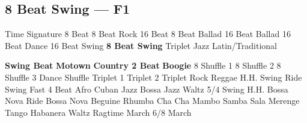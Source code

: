 \subsection{8 Beat Swing --- \UiKey{\II}\UiKey{\MET}F1}
Time Signature
8 Beat
8 Beat Rock
16 Beat
8 Beat Ballad
16 Beat Ballad
16 Beat Dance
16 Beat Swing
\textbf{8 Beat Swing}
Triplet
Jazz
Latin/Traditional





























\textbf{Swing Beat}
\textbf{Motown}
\textbf{Country 2 Beat}
\textbf{Boogie}
8 Shuffle 1
8 Shuffle 2
8 Shuffle 3
Dance Shuffle
Triplet 1
Triplet 2
Triplet Rock
Reggae
H.H. Swing
Ride Swing
Fast 4 Beat
Afro Cuban
Jazz Bossa
Jazz Waltz
5/4 Swing
H.H. Bossa Nova
Ride Bossa Nova
Beguine
Rhumba
Cha Cha
Mambo
Samba
Sala
Merenge
Tango
Habanera
Waltz
Ragtime
March
6/8 March
